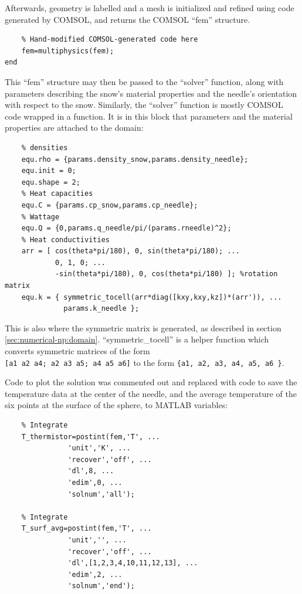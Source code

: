 Afterwards, geometry is labelled and a mesh is initialized and refined using
code generated by COMSOL, and returns the COMSOL ``fem'' structure.

\small
\begin{verbatim}
    % Hand-modified COMSOL-generated code here
    fem=multiphysics(fem);
end
\end{verbatim}
\normalsize

This ``fem'' structure may then be passed to the ``solver'' function, along
with parameters describing the snow's material properties and the needle's
orientation with respect to the snow. Similarly, the ``solver'' function is
mostly COMSOL code wrapped in a function. It is in this block that parameters
and the material properties are attached to the domain:

\small
\begin{verbatim}
    % densities
    equ.rho = {params.density_snow,params.density_needle};
    equ.init = 0;
    equ.shape = 2;
    % Heat capacities
    equ.C = {params.cp_snow,params.cp_needle};
    % Wattage
    equ.Q = {0,params.q_needle/pi/(params.rneedle)^2};
    % Heat conductivities
    arr = [ cos(theta*pi/180), 0, sin(theta*pi/180); ...
            0, 1, 0; ...
            -sin(theta*pi/180), 0, cos(theta*pi/180) ]; %rotation matrix
    equ.k = { symmetric_tocell(arr*diag([kxy,kxy,kz])*(arr')), ...
              params.k_needle };
\end{verbatim}
\normalsize

This is also where the symmetric matrix is generated, as described in section
\ref{sec:numerical-np:domain}. ``symmetric\_tocell'' is a helper function which
converts symmetric matrices of the form \\
\texttt{[a1 a2 a4; a2 a3 a5; a4 a5 a6]} to the form \texttt{\{a1, a2, a3, a4, a5, a6 \}}.

Code to plot the solution was commented out and replaced with code to save the
temperature data at the center of the needle, and the average temperature of the
six points at the surface of the sphere, to MATLAB variables:

\small
\begin{verbatim}
    % Integrate
    T_thermistor=postint(fem,'T', ...
               'unit','K', ...
               'recover','off', ...
               'dl',8, ...
               'edim',0, ...
               'solnum','all');

    % Integrate
    T_surf_avg=postint(fem,'T', ...
               'unit','', ...
               'recover','off', ...
               'dl',[1,2,3,4,10,11,12,13], ...
               'edim',2, ...
               'solnum','end');
\end{verbatim}
\normalsize

